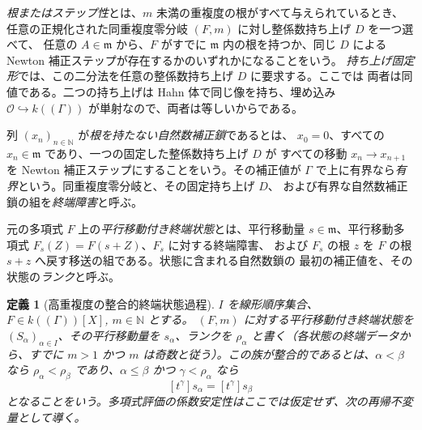 \documentclass[11pt,uplatex,dvipdfmx]{jsarticle}
\newcommand{\Ocal}{\mathcal O}
\theoremstyle{proofnote}
\newtheorem{definition}[theorem]{定義}
\begin{document}
\emph{根またはステップ性}とは、\(m\) 未満の重複度の根がすべて与えられているとき、
任意の正規化された同重複度零分岐 \((F,m)\) に対し整係数持ち上げ \(D\) を一つ選べて、
任意の \(A\in\mathfrak m\) から、\(F\) がすでに \(\mathfrak m\) 内の根を持つか、同じ
\(D\) による Newton 補正ステップが存在するかのいずれかになることをいう。
\emph{持ち上げ固定形}では、この二分法を任意の整係数持ち上げ \(D\) に要求する。ここでは
両者は同値である。二つの持ち上げは Hahn 体で同じ像を持ち、埋め込み
\(\Ocal\hookrightarrow k((\Gamma))\) が単射なので、両者は等しいからである。

列 \((x_n)_{n\in\mathbb N}\) が\emph{根を持たない自然数補正鎖}であるとは、
\(x_0=0\)、すべての \(x_n\in\mathfrak m\) であり、一つの固定した整係数持ち上げ \(D\) が
すべての移動 \(x_n\to x_{n+1}\) を Newton 補正ステップにすることをいう。その補正値が
\(\Gamma\) で上に有界なら\emph{有界}という。同重複度零分岐と、その固定持ち上げ \(D\)、
および有界な自然数補正鎖の組を\emph{終端障害}と呼ぶ。

元の多項式 \(F\) 上の\emph{平行移動付き終端状態}とは、平行移動量
\(s\in\mathfrak m\)、平行移動多項式 \(F_s(Z)=F(s+Z)\)、\(F_s\) に対する終端障害、
および \(F_s\) の根 \(z\) を \(F\) の根 \(s+z\) へ戻す移送の組である。状態に含まれる自然数鎖の
最初の補正値を、その状態の\emph{ランク}と呼ぶ。

\begin{definition}[高重複度の整合的終端状態過程]
\label{def:coherent-terminal-process}
  \(I\) を線形順序集合、\(F\in k((\Gamma))[X]\), \(m\in\mathbb N\) とする。
  \((F,m)\) に対する平行移動付き終端状態を \((S_\alpha)_{\alpha\in I}\)、その平行移動量を
  \(s_\alpha\)、ランクを \(\rho_\alpha\) と書く（各状態の終端データから、すでに
  \(m>1\) かつ \(m\) は奇数と従う）。この族が\emph{整合的}であるとは、\(\alpha<\beta\) なら
  \(\rho_\alpha<\rho_\beta\) であり、\(\alpha\le\beta\) かつ
  \(\gamma<\rho_\alpha\) なら
  \[
    [t^\gamma]s_\alpha=[t^\gamma]s_\beta
    \tag{TC}\label{eq:terminal-coherence}
  \]
  となることをいう。多項式評価の係数安定性はここでは仮定せず、次の再帰不変量として導く。
\end{definition}
\end{document}
